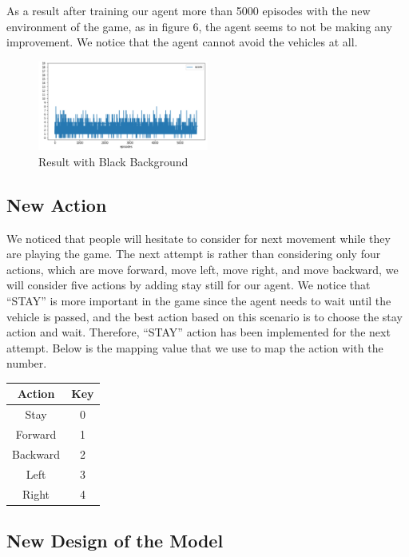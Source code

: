 \documentclass{article}
\begin{document}
As a result after training our agent more than 5000 episodes with the new environment of the game, as in figure 6, the agent seems to not be making any improvement. We notice that the agent cannot avoid the vehicles at all. \par 

\begin{figure}[H]
    \caption{Result with Black Background}
    \centering
    \includegraphics[width=0.5\textwidth]{result_black_background.png}
\end{figure}

\subsection{New Action}
We noticed that people will hesitate to consider for next movement while they are playing the game. The next attempt is rather than considering only four actions, which are move forward, move left, move right, and move backward, we will consider five actions by adding stay still for our agent. We notice that “STAY” is more important in the game since the agent needs to wait until the vehicle is passed, and the best action based on this scenario is to choose the stay action and wait. Therefore, “STAY” action has been implemented for the next attempt. Below is the mapping value that we use to map the action with the number.

\begin{center}
    \begin{tabular}{ | c | c |} 
        \hline
        Action & Key \\ 
        \hline
        Stay & 0\\ 
        \hline
        Forward & 1\\ 
        \hline
        Backward & 2 \\ 
        \hline
        Left & 3 \\
        \hline
        Right & 4 \\ 
        \hline
    \end{tabular}   
\end{center}

\subsection{New Design of the Model}
\end{document}
